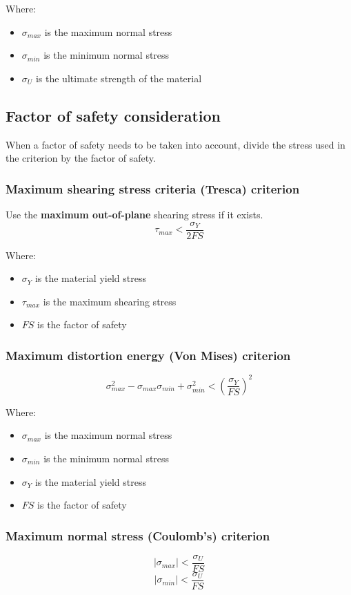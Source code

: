 \documentclass[11pt]{article}
\begin{document}
Where:
\begin{itemize}
\item \(\sigma_{max}\) is the maximum normal stress
\item \(\sigma_{min}\) is the minimum normal stress
\item \(\sigma_U\) is the ultimate strength of the material
\end{itemize}

\subsection{Factor of safety consideration}
\label{sec:org5aaf42d}
When a factor of safety needs to be taken into account, divide the stress used in the criterion by the factor of safety.

\subsubsection{Maximum shearing stress criteria (Tresca) criterion}
\label{sec:org863bffc}
Use the \textbf{maximum out-of-plane} shearing stress if it exists.
\[\tau_{max} < \frac{\sigma_Y}{2FS}\]

Where:
\begin{itemize}
\item \(\sigma_Y\) is the material yield stress
\item \(\tau_{max}\) is the maximum shearing stress
\item \(FS\) is the factor of safety
\end{itemize}

\subsubsection{Maximum distortion energy (Von Mises) criterion}
\label{sec:org22c9d7e}
\[\sigma_{max}^2 - \sigma_{max} \sigma_{min} + \sigma_{min}^2 < \left(\frac{\sigma_Y}{FS} \right)^2\]

Where:
\begin{itemize}
\item \(\sigma_{max}\) is the maximum normal stress
\item \(\sigma_{min}\) is the minimum normal stress
\item \(\sigma_{Y}\) is the material yield stress
\item \(FS\) is the factor of safety
\end{itemize}

\subsubsection{Maximum normal stress (Coulomb's) criterion}
\label{sec:org74b0cdb}
\[|\sigma_{max}| < \frac{\sigma_U}{FS}\]
\[|\sigma_{min}| < \frac{\sigma_U}{FS}\]
\end{document}
